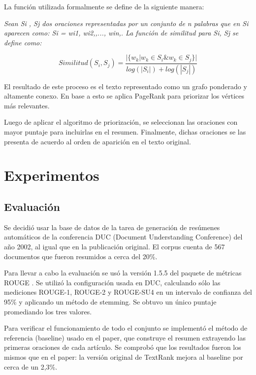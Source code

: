 \documentclass[a4paper]{article}
\begin{document}
La función utilizada formalmente se define de la siguiente manera:

\textit{Sean Si , Sj dos oraciones representadas por un conjunto de n palabras que en Si aparecen como: Si = wi1, wi2,,..., win,. La función de similitud para Si, Sj se define como:}

\begin{equation}
Similitud(S_{i},S_{j}) = \frac{ | \{   w_{k} | w_{k} \in S_{i} \& w_{k} \in S_{j}   \}  | }    
                              {  log(|S_{i}|) + log(|S_{j}|)  }
\end{equation}
    
El resultado de este proceso es el texto representado como un grafo ponderado y altamente conexo. En base a esto se aplica PageRank para priorizar los vértices más relevantes.

Luego de aplicar el algoritmo de priorización, se seleccionan las oraciones con mayor puntaje para incluirlas en el resumen. Finalmente, dichas oraciones se las presenta de acuerdo al orden de aparición en el texto original.


\section{Experimentos}

\subsection{Evaluación}
Se decidió usar la base de datos de la tarea de generación de resúmenes automáticos de la conferencia DUC (Document Understanding Conference) del año 2002, al igual que en la publicación original. El corpus cuenta de 567 documentos que fueron resumidos a cerca del 20\%.

Para llevar a cabo la evaluación se usó la versión 1.5.5 del paquete de métricas ROUGE \cite{Lin2004a}. Se utilizó la configuración usada en DUC, calculando sólo las mediciones ROUGE-1, ROUGE-2 y ROUGE-SU4 en un intervalo de confianza del 95\% y aplicando un método de stemming. Se obtuvo un único puntaje promediando los tres valores.

Para verificar el funcionamiento de todo el conjunto se implementó el método de referencia (baseline) usado en el paper, que construye el resumen extrayendo las primeras oraciones de cada artículo. Se comprobó que los resultados fueron los mismos que en el paper: la versión original de TextRank mejora al baseline por cerca de un 2,3\%.
\end{document}
